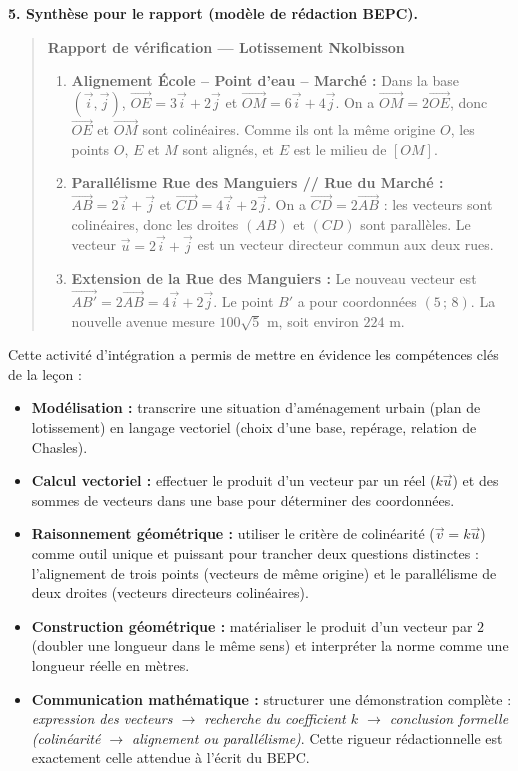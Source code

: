 \documentclass[11pt]{article}
\newcounter{popsec}
\newcounter{popsub}
\newcommand{\courssub}[1]{%
  \stepcounter{popsub}%
  \par\vspace{9pt}\noindent{\popxbold\fontsize{11.5}{13}\selectfont\color{popink}{\color{poporange}\thepopsec.\thepopsub}\hspace{6pt}#1}\par\nopagebreak\vspace{4pt}
}
\begin{document}
\begin{exoresolu}
\textbf{5. Synthèse pour le rapport (modèle de rédaction BEPC).}
\begin{quote}
\textbf{Rapport de vérification — Lotissement Nkolbisson}
\begin{enumerate}
    \item \textbf{Alignement École – Point d'eau – Marché :}
    Dans la base $(\vec{i}, \vec{j})$, $\overrightarrow{OE} = 3\vec{i}+2\vec{j}$ et $\overrightarrow{OM} = 6\vec{i}+4\vec{j}$.
    On a $\overrightarrow{OM} = 2\overrightarrow{OE}$, donc $\overrightarrow{OE}$ et $\overrightarrow{OM}$ sont colinéaires. Comme ils ont la même origine $O$, les points $O$, $E$ et $M$ sont alignés, et $E$ est le milieu de $[OM]$.
    \item \textbf{Parallélisme Rue des Manguiers // Rue du Marché :}
    $\overrightarrow{AB} = 2\vec{i}+\vec{j}$ et $\overrightarrow{CD} = 4\vec{i}+2\vec{j}$.
    On a $\overrightarrow{CD} = 2\overrightarrow{AB}$ : les vecteurs sont colinéaires, donc les droites $(AB)$ et $(CD)$ sont parallèles. Le vecteur $\vec{u} = 2\vec{i}+\vec{j}$ est un vecteur directeur commun aux deux rues.
    \item \textbf{Extension de la Rue des Manguiers :}
    Le nouveau vecteur est $\overrightarrow{AB'} = 2\overrightarrow{AB} = 4\vec{i}+2\vec{j}$.
    Le point $B'$ a pour coordonnées $(5\,;\,8)$. La nouvelle avenue mesure $100\sqrt{5}$ m, soit environ $224$ m.
\end{enumerate}
\end{quote}
\end{exoresolu}

\courssub{Bilan de l'activité}
Cette activité d'intégration a permis de mettre en évidence les compétences clés de la leçon :
\begin{itemize}
    \item \textbf{Modélisation :} transcrire une situation d'aménagement urbain (plan de lotissement) en langage vectoriel (choix d'une base, repérage, relation de Chasles).
    \item \textbf{Calcul vectoriel :} effectuer le produit d'un vecteur par un réel ($k\vec{u}$) et des sommes de vecteurs dans une base pour déterminer des coordonnées.
    \item \textbf{Raisonnement géométrique :} utiliser le critère de colinéarité ($\vec{v} = k\vec{u}$) comme outil unique et puissant pour trancher deux questions distinctes : l'alignement de trois points (vecteurs de même origine) et le parallélisme de deux droites (vecteurs directeurs colinéaires).
    \item \textbf{Construction géométrique :} matérialiser le produit d'un vecteur par $2$ (doubler une longueur dans le même sens) et interpréter la norme comme une longueur réelle en mètres.
    \item \textbf{Communication mathématique :} structurer une démonstration complète : \emph{expression des vecteurs $\to$ recherche du coefficient $k$ $\to$ conclusion formelle (colinéarité $\to$ alignement ou parallélisme)}. Cette rigueur rédactionnelle est exactement celle attendue à l'écrit du BEPC.
\end{itemize}
\end{document}
